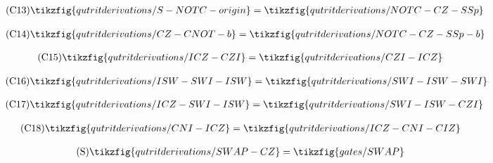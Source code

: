 \begin{figure}[ht]
{\begin{minipage}{.975\textwidth}
\begin{center}
\begin{subfigure}{0.47\textwidth}
\begin{align}
            \end{align}
        \end{subfigure}
        \begin{subfigure}{0.5\textwidth}
            \begin{align}\label{qt-C10}\tag{C13}
                \tikzfig{qutritderivations/S-NOTC-origin} = \tikzfig{qutritderivations/NOTC-CZ-SSp}
            \end{align}
        \end{subfigure}
        \begin{subfigure}{0.54\textwidth}
            \begin{align}\label{qt-C11}\tag{C14}
                \tikzfig{qutritderivations/CZ-CNOT-b} = \tikzfig{qutritderivations/NOTC-CZ-SSp-b}
            \end{align}
        \end{subfigure}
        \begin{subfigure}{0.38\textwidth}
            \begin{align}\label{qt-C13}\tag{C15}
                \tikzfig{qutritderivations/ICZ-CZI} = \tikzfig{qutritderivations/CZI-ICZ}
            \end{align}
        \end{subfigure}
        \begin{subfigure}{0.67\textwidth}
            \begin{align}\label{qt-C14}\tag{C16}
                \tikzfig{qutritderivations/ISW-SWI-ISW} = \tikzfig{qutritderivations/SWI-ISW-SWI}
            \end{align}
        \end{subfigure}
        \begin{subfigure}{0.63\textwidth}
            \begin{align}\label{qt-C15}\tag{C17}
                \tikzfig{qutritderivations/ICZ-SWI-ISW} = \tikzfig{qutritderivations/SWI-ISW-CZI}
            \end{align}
        \end{subfigure}
        \begin{subfigure}{0.41\textwidth}
            \begin{align}\label{qt-C16}\tag{C18}
                \tikzfig{qutritderivations/CNI-ICZ} = \tikzfig{qutritderivations/ICZ-CNI-CIZ}
            \end{align}
        \end{subfigure}
        \begin{subfigure}{0.38\textwidth}
            \begin{align}\label{qt-Swap}\tag{S}
                \tikzfig{qutritderivations/SWAP-CZ} = \tikzfig{gates/SWAP}
            \end{align}
        \end{subfigure}
        

\end{center}
\end{minipage}}
\end{figure}
